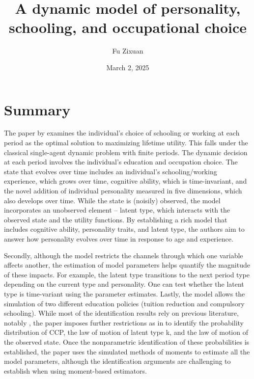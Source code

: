 \documentclass[12pt]{article}
\title{\textbf{A dynamic model of personality, schooling, and occupational choice}}
\author{Fu Zixuan}
\date{March 2, 2025}
\begin{document}
\maketitle




\section{Summary}
The paper by \citet{todd2020dynamic} examines the individual's choice of
schooling or working at each period as the optimal solution to maximizing
lifetime utility. This falls under the classical single-agent dynamic problem
with finite periods. The dynamic decision at each period involves the
individual's education and occupation choice. The state that evolves over time
includes an individual's schooling/working experience, which grows over time,
cognitive ability, which is time-invariant, and the novel addition of
individual personality measured in five dimensions, which also develops over
time. While the state is (noisily) observed, the model incorporates an
unobserved element -- latent type, which interacts with the observed state and
the utility functions. By establishing a rich model that includes
cognitive ability, personality traits, and latent type, the authors aim to
answer how personality evolves over time in response to age and experience.

Secondly, although the model restricts the channels through which one variable
affects another, the estimation of model parameters helps quantify the
magnitude of these impacts. For example, the latent type transitions to the
next period type depending on the current type and personality. One can test
whether the latent type is time-variant using the parameter estimates. Lastly,
the model allows the simulation of two different education policies (tuition
reduction and compulsory schooling). While most of the identification results
rely on previous literature, notably \cite{hu2012nonparametric}, the paper
imposes further restrictions as in \citet{hu2017simple} to identify the
probability distribution of CCP, the law of motion of latent type k, and the
law of motion of the observed state. Once the nonparametric identification of
these probabilities is established, the paper uses the simulated methods of
moments to estimate all the model parameters, although the identification
arguments are challenging to establish when using moment-based estimators.
\end{document}
